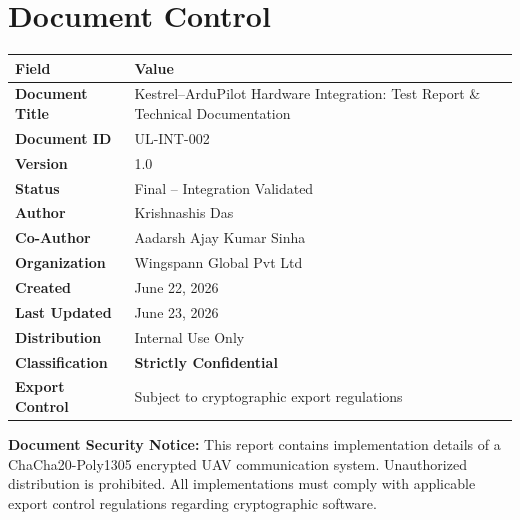 \documentclass[11pt,a4paper]{article}
\begin{document}
\newpage
\section*{Document Control}

\begin{table}[H]
    \renewcommand{\arraystretch}{1.5}
    \begin{tabularx}{\textwidth}{@{}lX@{}}
        \toprule
        \textbf{Field}            & \textbf{Value} \\
        \midrule
        \textbf{Document Title}   & Kestrel--ArduPilot Hardware Integration:
                                    Test Report \& Technical Documentation \\
        \textbf{Document ID}      & UL-INT-002 \\
        \textbf{Version}          & 1.0 \\
        \textbf{Status}           & Final -- Integration Validated \\
        \midrule
        \textbf{Author}           & Krishnashis Das \\
        \textbf{Co-Author}        & Aadarsh Ajay Kumar Sinha \\
        \textbf{Organization}     & Wingspann Global Pvt Ltd \\
        \midrule
        \textbf{Created}          & June 22, 2026 \\
        \textbf{Last Updated}     & June 23, 2026 \\
        \midrule
        \textbf{Distribution}     & Internal Use Only \\
        \textbf{Classification}   & \textcolor{alertred}{\textbf{Strictly
                                    Confidential}} \\
        \textbf{Export Control}   & Subject to cryptographic export regulations \\
        \bottomrule
    \end{tabularx}
\end{table}

\vspace{0.8cm}

\begin{alertbox}
    \textbf{Document Security Notice:} This report contains implementation
    details of a ChaCha20-Poly1305 encrypted UAV communication system.
    Unauthorized distribution is prohibited. All implementations must comply
    with applicable export control regulations regarding cryptographic software.
\end{alertbox}
\end{document}
